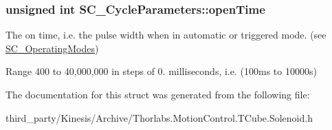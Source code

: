 \subsubsection[{\texorpdfstring{open\+Time}{openTime}}]{\setlength{\rightskip}{0pt plus 5cm}unsigned int S\+C\+\_\+\+Cycle\+Parameters\+::open\+Time}\hypertarget{struct_s_c___cycle_parameters_a1a6ce4376230caffb1828a855568f672}{}\label{struct_s_c___cycle_parameters_a1a6ce4376230caffb1828a855568f672}


The on time, i.\+e. the pulse width when in automatic or triggered mode. (see \hyperlink{group___t_cube_solenoid_ga02b53b0f5b45f74b6b2da24cc6ff2895}{S\+C\+\_\+\+Operating\+Modes}) ~\newline
 

Range 400 to 40,000,000 in steps of 0. milliseconds, i.\+e. (100ms to 10000s) 

The documentation for this struct was generated from the following file\+:\begin{DoxyCompactItemize}
\item 
third\+\_\+party/\+Kinesis/\+Archive/Thorlabs.\+Motion\+Control.\+T\+Cube.\+Solenoid.\+h\end{DoxyCompactItemize}
